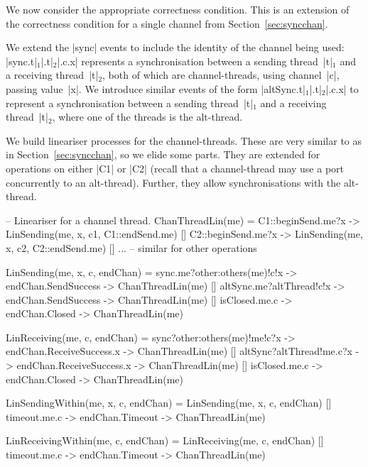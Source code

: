 
We now consider the appropriate correctness condition.   This is an extension
of the correctness condition for a single channel from
Section~\ref{sec:syncchan}. 

We extend the |sync| events to include the identity of the channel being used:
|sync.t|$_1$|.t|$_2$|.c.x| represents a synchronisation between a sending
thread~|t|$_1$ and a receiving thread~|t|$_2$, both of which are
channel-threads, using channel~|c|, passing value~|x|.
%
We introduce similar events of the form |altSync.t|$_1$|.t|$_2$|.c.x| to
represent a synchronisation between a sending thread~|t|$_1$ and a receiving
thread~|t|$_2$, where one of the threads is the alt-thread.

We build lineariser processes for the channel-threads.  These are very similar
to as in Section~\ref{sec:syncchan}, so we elide some parts.  They are
extended for operations on either |C1| or |C2| (recall that a channel-thread
may use a port concurrently to an alt-thread).  Further, they allow
synchronisations with the alt-thread.
%
\begin{cspm}
-- Lineariser for a channel thread.
ChanThreadLin(me) = 
  C1::beginSend.me?x -> LinSending(me, x, c1, C1::endSend.me)
  [] C2::beginSend.me?x -> LinSending(me, x, c2, C2::endSend.me)
  [] ... -- similar for other operations 

LinSending(me, x, c, endChan) = 
  sync.me?other:others(me)!c!x -> endChan.SendSuccess -> ChanThreadLin(me)
  [] altSync.me?altThread!c!x -> endChan.SendSuccess -> ChanThreadLin(me)
  [] isClosed.me.c -> endChan.Closed -> ChanThreadLin(me)

LinReceiving(me, c, endChan) = 
  sync?other:others(me)!me!c?x -> endChan.ReceiveSuccess.x -> ChanThreadLin(me)
  [] altSync?altThread!me.c?x -> endChan.ReceiveSuccess.x -> ChanThreadLin(me)
  [] isClosed.me.c -> endChan.Closed -> ChanThreadLin(me)

LinSendingWithin(me, x, c, endChan) = 
  LinSending(me, x, c, endChan)
  [] timeout.me.c -> endChan.Timeout -> ChanThreadLin(me)

LinReceivingWithin(me, c, endChan) = 
  LinReceiving(me, c, endChan)
  [] timeout.me.c -> endChan.Timeout -> ChanThreadLin(me) 
\end{cspm}

